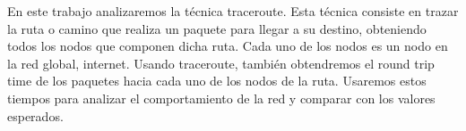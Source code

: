 En este trabajo analizaremos la técnica traceroute. Esta técnica consiste en trazar la ruta o camino que realiza un paquete para llegar a su destino, obteniendo todos los nodos que componen dicha ruta. Cada uno de los nodos es un nodo en la red global, internet. Usando traceroute, también obtendremos el round trip time de los paquetes hacia cada uno de los nodos de la ruta. Usaremos estos tiempos para analizar el comportamiento de la red y comparar con los valores esperados.